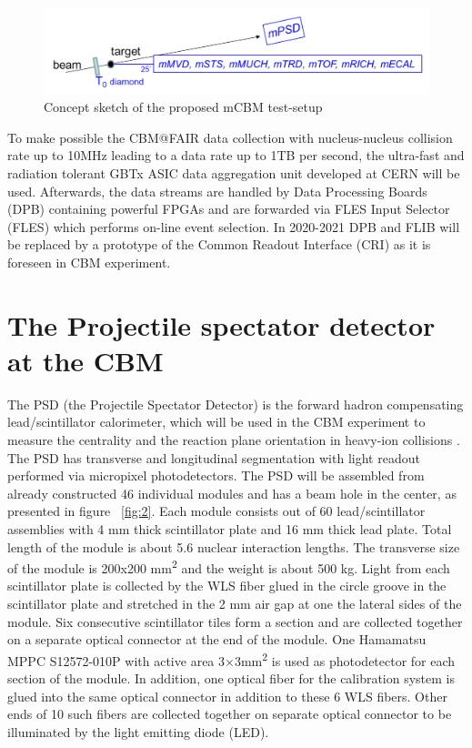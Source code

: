 \documentclass[a4paper,11pt]{article}
\begin{document}
\begin{figure}[htbp]
	\centering 
	\includegraphics[width=.8\textwidth]{mCBM_sketch.png}
	\caption{\label{fig:1} Concept sketch of the proposed mCBM test-setup}
\end{figure}

To make possible the CBM@FAIR data collection with nucleus-nucleus collision rate up to 10MHz leading to a data rate up to 1TB per second, the ultra-fast and radiation tolerant GBTx ASIC data aggregation unit developed at CERN will be used. Afterwards, the data streams are handled by Data Processing Boards (DPB) containing powerful FPGAs and are forwarded via FLES Input Selector (FLES) which performs on-line event selection. In 2020-2021 DPB and FLIB will be replaced by a prototype of the Common Readout Interface (CRI) as it is foreseen in CBM experiment.


\section{The Projectile spectator detector at the CBM}
The PSD (the Projectile Spectator Detector) is the forward hadron compensating lead/scintillator calorimeter, which will be used in the CBM experiment to measure the centrality and the reaction plane orientation in heavy-ion collisions \cite{3}. The PSD has transverse and longitudinal segmentation with light readout performed via micropixel photodetectors. 
The PSD will be assembled from already constructed 46 individual modules and has a beam hole in the center, as presented in figure ~\ref{fig:2}. Each module consists out of 60 lead/scintillator assemblies with 4 mm thick scintillator plate and 16 mm thick lead plate. Total length of the module is about 5.6 nuclear interaction lengths. The transverse size of the module is 200x200 mm\textsuperscript{2} and the weight is about 500 kg. Light from each scintillator plate is collected by the WLS fiber glued in the circle groove in the scintillator plate and stretched in the 2 mm air gap at one the lateral sides of the module. Six consecutive scintillator tiles form a section and are collected together on a separate optical connector at the end of the module. One Hamamatsu MPPC S12572-010P with active area 3×3mm\textsuperscript{2} is used as photodetector for each section of the module. In addition, one optical fiber for the calibration system is glued into the same optical connector in addition to these 6 WLS fibers. Other ends of 10 such fibers are collected together on separate optical connector to be illuminated by the light emitting diode (LED). 
\end{document}
